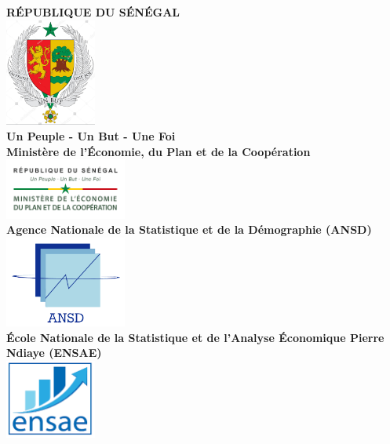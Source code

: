 \documentclass[
]{article}
\author{}
\date{\vspace{-2.5em}}
\begin{document}
\begin{titlepage}
    \begin{center}
        \textbf{\LARGE RÉPUBLIQUE DU SÉNÉGAL}\\[0.1cm]
        \includegraphics[width=3cm]{Logo1.jpg} \\[0.1cm]  %
        \textbf{\large Un Peuple - Un But - Une Foi}\\[0.2cm]
        
        \textbf{\LARGE Ministère de l'Économie, du Plan et de la Coopération}\\[0.1cm]
        \includegraphics[width=4cm]{Logo2.png} \\[0.1cm] 
        
        \textbf{\large Agence Nationale de la Statistique et de la Démographie (ANSD)}\\[0.2cm]
        
        \includegraphics[width=4cm]{Logo3.png} \\[0.1cm]  
        
        \textbf{\large École Nationale de la Statistique et de l'Analyse Économique Pierre Ndiaye (ENSAE)}\\[0.4cm]
        \includegraphics[width=3cm]{Logo4.png} \\[0.1cm]
        

\end{center}
\end{titlepage}
\end{document}
